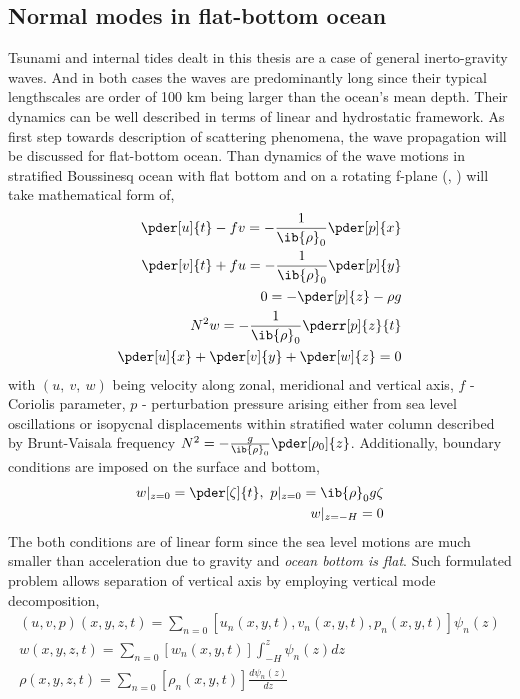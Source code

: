 \subsection{Normal modes in flat-bottom ocean}
Tsunami and internal tides dealt in this thesis are a case of general inerto-gravity waves. And in both cases the waves are predominantly long since their typical lengthscales are order of 100 km being larger than the ocean's mean depth. Their dynamics can be well described in terms of linear and hydrostatic framework. As first step towards description of scattering phenomena, the wave propagation will be discussed for flat-bottom ocean. Than dynamics of the wave motions in stratified Boussinesq ocean with flat bottom and on a rotating f-plane (\cite{kundu2008fluid}, \cite{cushman2011introduction}) will take mathematical form of,
\begin{align}
\pder[u]{t} - f v = -\frac{1}{\ib{\rho}_0}\pder[p]{x}\\
\pder[v]{t} + f u = -\frac{1}{\ib{\rho}_0}\pder[p]{y}\\
0 = -\pder[p]{z} - \rho g\\
N^2 w = -\frac{1}{\ib{\rho}_0} \pderr[p]{z}{t}\\
\pder[u]{x} + \pder[v]{y} + \pder[w]{z} = 0
\end{align}
with $(u,~v,~w)$ being velocity along zonal, meridional and vertical axis, $f$ - Coriolis parameter, $p$ - perturbation pressure arising either from sea level oscillations or isopycnal displacements within stratified water column described by Brunt-Vaisala frequency $N^2 = -\frac{g}{\ib{\rho}_0}\pder[\rho_0]{z}$. Additionally, boundary conditions are imposed on the surface and bottom,
\begin{align}
w|_{z = 0} = \pder[\zeta]{t},~p|_{z = 0} = \ib{\rho}_0 g \zeta\\
w|_{z = -H} = 0
\end{align}
The both conditions are of linear form since the sea level motions are much smaller than acceleration due to gravity and \textit{ocean bottom is flat}. Such formulated problem allows separation of vertical axis by employing vertical mode decomposition,
\begin{align}
(u, v, p)(x,y,z,t) = \sum_{n = 0} [u_n(x,y,t), v_n(x,y,t), p_n(x,y,t)]\psi_n(z)\\
w(x,y,z,t) = \sum_{n = 0} [w_n(x,y,t)] \int_{-H}^z \psi_n(z) dz\\
\rho(x,y,z,t) = \sum_{n = 0} [\rho_n(x,y,t)] \frac{d \psi_n(z)}{dz}
\end{align}
